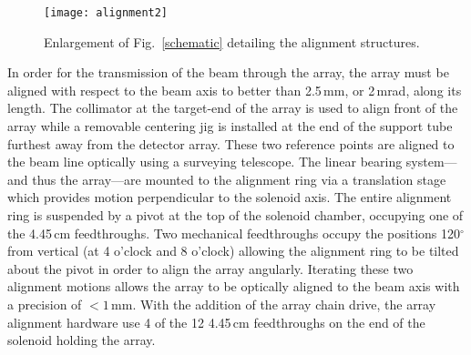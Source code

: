 \begin{figure}%
\centering
\texttt{[image: alignment2]}%
\caption{Enlargement of Fig.~\ref{schematic} detailing the alignment structures.}%
\label{align}%
\end{figure}

In order for the transmission of the beam through the array, the array must be aligned with respect to the beam axis to better than 2.5\,mm, or 2\,mrad, along its length.  The collimator at the target-end of the array is used to align front of the array while a removable centering jig is installed at the end of the support tube furthest away from the detector array.  These two reference points are aligned to the beam line optically using a surveying telescope.  The linear bearing system---and thus the array---are mounted to the alignment ring via a translation stage which provides motion perpendicular to the solenoid axis.  The entire alignment ring is suspended by a pivot at the top of the solenoid chamber, occupying one of the 4.45\,cm feedthroughs.  Two mechanical feedthroughs occupy the positions 120$^\circ$ from vertical (at 4 o'clock and 8 o'clock) allowing the alignment ring to be tilted about the pivot in order to align the array angularly.  Iterating these two alignment motions allows the array to be optically aligned to the beam axis with a precision of $<1$\,mm.  With the addition of the array chain drive, the array alignment hardware use 4 of the 12 4.45\,cm feedthroughs on the end of the solenoid holding the array.


